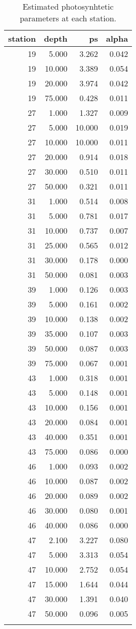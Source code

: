 \begin{longtable}{rrrr}
  \hline
station & depth & ps & alpha \\ 
  \hline
  19 & 5.000 & 3.262 & 0.042 \\ 
    19 & 10.000 & 3.389 & 0.054 \\ 
    19 & 20.000 & 3.974 & 0.042 \\ 
    19 & 75.000 & 0.428 & 0.011 \\ 
    27 & 1.000 & 1.327 & 0.009 \\ 
    27 & 5.000 & 10.000 & 0.019 \\ 
    27 & 10.000 & 10.000 & 0.011 \\ 
    27 & 20.000 & 0.914 & 0.018 \\ 
    27 & 30.000 & 0.510 & 0.011 \\ 
    27 & 50.000 & 0.321 & 0.011 \\ 
    31 & 1.000 & 0.514 & 0.008 \\ 
    31 & 5.000 & 0.781 & 0.017 \\ 
    31 & 10.000 & 0.737 & 0.007 \\ 
    31 & 25.000 & 0.565 & 0.012 \\ 
    31 & 30.000 & 0.178 & 0.000 \\ 
    31 & 50.000 & 0.081 & 0.003 \\ 
    39 & 1.000 & 0.126 & 0.003 \\ 
    39 & 5.000 & 0.161 & 0.002 \\ 
    39 & 10.000 & 0.138 & 0.002 \\ 
    39 & 35.000 & 0.107 & 0.003 \\ 
    39 & 50.000 & 0.087 & 0.003 \\ 
    39 & 75.000 & 0.067 & 0.001 \\ 
    43 & 1.000 & 0.318 & 0.001 \\ 
    43 & 5.000 & 0.148 & 0.001 \\ 
    43 & 10.000 & 0.156 & 0.001 \\ 
    43 & 20.000 & 0.084 & 0.001 \\ 
    43 & 40.000 & 0.351 & 0.001 \\ 
    43 & 75.000 & 0.086 & 0.000 \\ 
    46 & 1.000 & 0.093 & 0.002 \\ 
    46 & 10.000 & 0.087 & 0.002 \\ 
    46 & 20.000 & 0.089 & 0.002 \\ 
    46 & 30.000 & 0.080 & 0.001 \\ 
    46 & 40.000 & 0.086 & 0.000 \\ 
    47 & 2.100 & 3.227 & 0.080 \\ 
    47 & 5.000 & 3.313 & 0.054 \\ 
    47 & 10.000 & 2.752 & 0.054 \\ 
    47 & 15.000 & 1.644 & 0.044 \\ 
    47 & 30.000 & 1.391 & 0.040 \\ 
    47 & 50.000 & 0.096 & 0.005 \\ 
   \hline
\hline
\caption{Estimated photosynhtetic parameters at each station.} 
\end{longtable}
